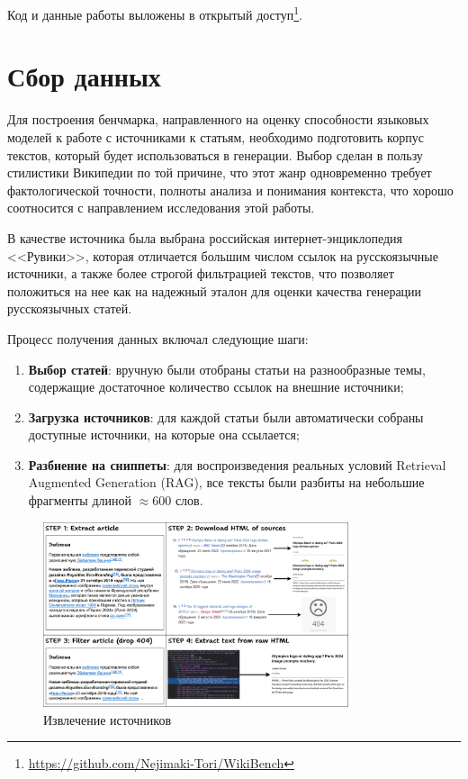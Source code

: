 \documentclass{article}
\begin{document}
Код и данные работы выложены в открытый доступ\footnote{\url{https://github.com/Nejimaki-Tori/WikiBench}}.

\section*{Сбор данных}

Для построения бенчмарка, направленного на оценку способности языковых моделей к работе с источниками к статьям, необходимо подготовить корпус текстов, который будет использоваться в генерации. 
Выбор сделан в пользу стилистики Википедии по той причине, что этот жанр одновременно требует фактологической точности, полноты анализа и понимания контекста, что хорошо соотносится с направлением исследования этой работы.

В качестве источника была выбрана российская интернет-энциклопедия <<Рувики>>, которая отличается большим числом ссылок на русскоязычные источники, а также более строгой фильтрацией текстов, 
что позволяет положиться на нее как на надежный эталон для оценки качества генерации русскоязычных статей.

Процесс получения данных включал следующие шаги:

\begin{enumerate}

    \item \textbf{Выбор статей}: вручную были отобраны статьи на разнообразные темы, содержащие достаточное количество ссылок на внешние источники;
    
    \item \textbf{Загрузка источников}: для каждой статьи были автоматически собраны доступные источники, на которые она ссылается;
    
    \item \parbox[t]{0.9\textwidth}{\textbf{Разбиение на сниппеты}: для воспроизведения реальных условий Retrieval Augmented Generation (RAG), все тексты были разбиты на небольшие фрагменты длиной $\approx 600$ слов.}

\end{enumerate}

\begin{figure}[ht!]
  \centering
  \includegraphics[width=0.8\textwidth]{figures/Source_extract.png}
  \caption{Извлечение источников}
  \label{fig:source}
\end{figure}
\end{document}
